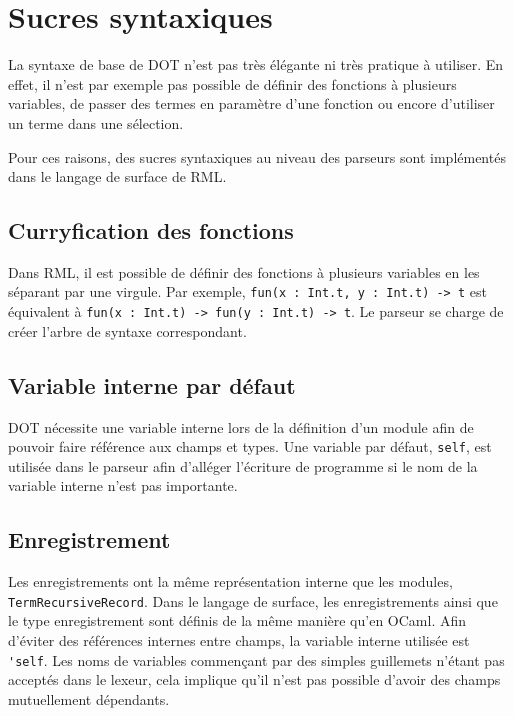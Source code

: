 \section{Sucres syntaxiques}

La syntaxe de base de DOT n'est pas très élégante ni très pratique à utiliser.
En effet, il n'est par exemple pas possible de définir des fonctions à plusieurs
variables, de passer des termes en paramètre d'une fonction ou encore d'utiliser
un terme dans une sélection.

Pour ces raisons, des sucres syntaxiques au niveau des parseurs sont implémentés
dans le langage de surface de RML.

\subsection*{Curryfication des fonctions}

Dans RML, il est possible de définir des fonctions à plusieurs variables en les
séparant par une virgule.
Par exemple, \verb|fun(x : Int.t, y : Int.t) -> t| est équivalent à
\verb|fun(x : Int.t) -> fun(y : Int.t) -> t|. Le parseur se charge de créer l'arbre de
syntaxe correspondant.

\subsection*{Variable interne par défaut}

DOT nécessite une variable interne lors de la définition d'un module afin de
pouvoir faire référence aux champs et types. Une variable par défaut,
\verb|self|, est utilisée dans le parseur afin d'alléger l'écriture de programme
si le nom de la variable interne n'est pas importante.

\subsection*{Enregistrement}

Les enregistrements ont la même représentation interne que les modules,
\verb|TermRecursiveRecord|. Dans le langage de surface, les enregistrements
ainsi que le type enregistrement sont définis de la même manière qu'en OCaml.
Afin d'éviter des références internes entre champs, la variable interne utilisée
est \verb|'self|. Les noms de variables commençant par des simples guillemets
n'étant pas acceptés dans le lexeur, cela implique qu'il n'est pas possible
d'avoir des champs mutuellement dépendants.

